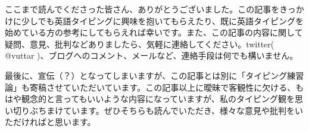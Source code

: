 ここまで読んでくださった皆さん、ありがとうございました。この記事をきっかけに少しでも英語タイピングに興味を抱いてもらえたり、既に英語タイピングを始めている方の参考にしてもらえれば幸いです。また、この記事の内容に関して疑問、意見、批判などありましたら、気軽に連絡してください。twitter( @vuttar )、ブログへのコメント、メールなど、連絡手段は何でも構いません。

最後に、宣伝（？）となってしまいますが、この記事とは別に「タイピング練習論」も寄稿させていただいています。この記事以上に曖昧で客観性に欠ける、もはや観念的と言ってもいいような内容になっていますが、私のタイピング観を思い切りぶちまけています。ぜひそちらも読んでいただき、様々な意見や批判をいただければと思います。
